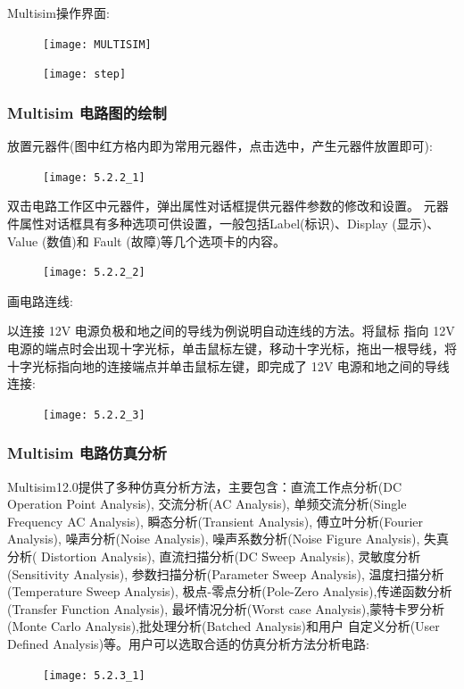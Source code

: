 \documentclass[a4paper,11pt,UTF8]{article}
\numberwithin{equation}{subsection}
\begin{document}
Multisim操作界面:
\begin{figure}[H]
	\centering
	\texttt{[image: MULTISIM]}	
\end{figure}

\begin{figure}[H]
	\centering
	\texttt{[image: step]}	
\end{figure}
\subsubsection{Multisim 电路图的绘制}
放置元器件(图中红方格内即为常用元器件，点击选中，产生元器件放置即可):
\begin{figure}[H]
	\centering
	\texttt{[image: 5.2.2\_1]}	
\end{figure}

双击电路工作区中元器件，弹出属性对话框提供元器件参数的修改和设置。
元器件属性对话框具有多种选项可供设置，一般包括Label(标识)、Display (显示)、Value (数值)和 Fault (故障)等几个选项卡的内容。
\begin{figure}[H]
	\centering
	\texttt{[image: 5.2.2\_2]}	
\end{figure}

画电路连线:

以连接 12V 电源负极和地之间的导线为例说明自动连线的方法。将鼠标
指向 12V 电源的端点时会出现十字光标，单击鼠标左键，移动十字光标，拖出一根导线，将十字光标指向地的连接端点并单击鼠标左键，即完成了 12V 电源和地之间的导线连接:
\begin{figure}[H]
	\centering
	\texttt{[image: 5.2.2\_3]}	
\end{figure}
\subsubsection{Multisim 电路仿真分析 }
Multisim12.0提供了多种仿真分析方法，主要包含：直流工作点分析(DC Operation Point Analysis), 交流分析(AC Analysis), 单频交流分析(Single Frequency AC Analysis), 瞬态分析(Transient Analysis), 傅立叶分析(Fourier Analysis), 噪声分析(Noise Analysis), 噪声系数分析(Noise Figure Analysis), 失真分析( Distortion Analysis), 直流扫描分析(DC Sweep Analysis), 灵敏度分析(Sensitivity Analysis), 参数扫描分析(Parameter Sweep Analysis), 温度扫描分析(Temperature Sweep Analysis), 极点-零点分析(Pole-Zero Analysis),传递函数分析(Transfer Function Analysis), 最坏情况分析(Worst case Analysis),蒙特卡罗分析(Monte Carlo Analysis),批处理分析(Batched Analysis)和用户 自定义分析(User Defined Analysis)等。用户可以选取合适的仿真分析方法分析电路:
\begin{figure}[H]
	\centering
	\texttt{[image: 5.2.3\_1]}	
\end{figure}
\end{document}
